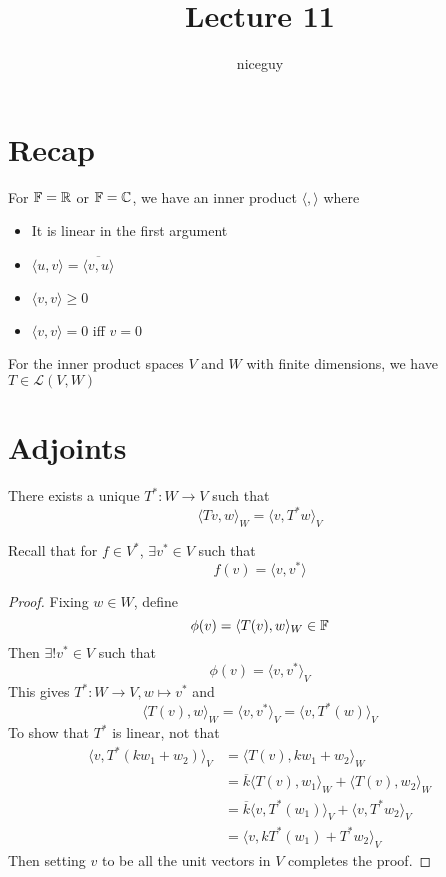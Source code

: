 \documentclass[12pt]{article}
\author{niceguy}
\title{Lecture 11}
\begin{document}
\maketitle

\section{Recap}

For $\mathbb{F} = \mathbb{R}$ or $\mathbb{F} = \mathbb{C}$, we have an inner product $\langle , \rangle$ where
\begin{itemize}
	\item It is linear in the first argument
	\item $\langle u,v \rangle = \overline{\langle v,u \rangle}$
	\item $\langle v,v \rangle \geq 0$
	\item $\langle v,v \rangle = 0$ iff $v=0$
\end{itemize}

For the inner product spaces $V$ and $W$ with finite dimensions, we have $T \in \mathcal L(V,W)$

\section{Adjoints}

\begin{thm}
	There exists a unique $T^*: W \rightarrow V$ such that
	$$\langle Tv,w \rangle_W = \langle v,T^*w \rangle_V$$
\end{thm}

Recall that for $f \in V^*$, $\exists v^* \in V$ such that
$$f(v) = \langle v,v^* \rangle$$

\begin{proof}
	Fixing $w \in W$, define
	$$\phi(v) = \langle T(v),w \rangle_W \in \mathbb{F}$$
	Then $\exists!v^*\in V$ such that
	$$\phi(v) = \langle v,v^* \rangle_V$$
	This gives $T^*:W\rightarrow V, w\mapsto v^*$ and
	$$\langle T(v),w \rangle_W = \langle v,v^* \rangle_V = \langle v,T^*(w) \rangle_V$$
	To show that $T^*$ is linear, not that
	\begin{align*}
		\langle v,T^*(kw_1+w_2) \rangle_V &= \langle T(v), kw_1 + w_2 \rangle_W \\
						  &= \overline{k}\langle T(v),w_1 \rangle_W + \langle T(v),w_2 \rangle_W \\
						  &= \overline{k}\langle v,T^*(w_1) \rangle_V + \langle v,T^*w_2 \rangle_V \\
						  &= \langle v,kT^*(w_1)+T^*w_2 \rangle_V
	\end{align*}
	Then setting $v$ to be all the unit vectors in $V$ completes the proof.
\end{proof}
\end{document}
